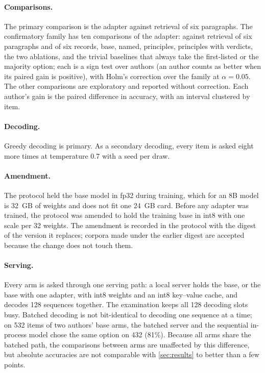 \paragraph{Comparisons.} The primary comparison is the adapter against retrieval of six
paragraphs. The confirmatory family has ten comparisons of the adapter: against
retrieval of six paragraphs and of six records, base, named, principles, principles with
verdicts, the two ablations, and the trivial baselines that always take the first-listed or
the majority option; each is a sign test over authors (an author counts
as better when its paired gain is positive), with Holm's correction over the family at
$\alpha = 0.05$. The other comparisons are exploratory and reported without correction. Each
author's gain is the paired difference in accuracy, with an interval clustered by item.

\paragraph{Decoding.} Greedy decoding is primary. As a secondary decoding, every item is
asked eight more times at temperature 0.7 with a seed per draw.

\paragraph{Amendment.} The protocol held the base model in fp32 during training, which for an
8B model is 32~GB of weights and does not fit one 24~GB card. Before any adapter was trained,
the protocol was amended to hold the training base in int8 with one scale per 32 weights. The
amendment is recorded in the protocol with the digest of the version it replaces; corpora made
under the earlier digest are accepted because the change does not touch them.

\paragraph{Serving.} Every arm is asked through one serving path: a local server holds the
base, or the base with one adapter, with int8 weights and an int8 key--value cache, and
decodes 128 sequences together. The examination keeps all 128 decoding slots busy. Batched
decoding is not bit-identical to decoding one sequence at a time; on 532 items of two authors'
base arms, the batched server and the sequential in-process model chose the same option on 432
(81\%). Because all arms share the batched path, the comparisons between arms are unaffected
by this difference, but absolute accuracies are not comparable with \cref{sec:results} to
better than a few points.

